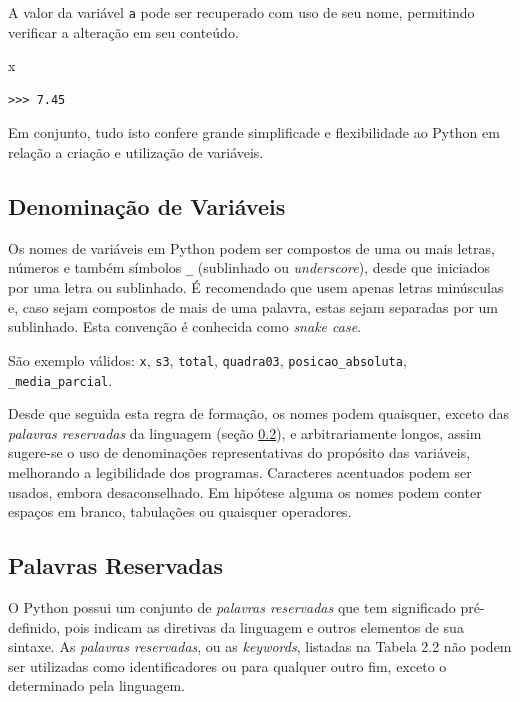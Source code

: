 \documentclass[
]{book}
\newenvironment{Shaded}{\begin{snugshade}}{\end{snugshade}}
\newcommand{\NormalTok}[1]{#1}
\begin{document}
A valor da variável \texttt{a} pode ser recuperado com uso de seu nome, permitindo verificar a alteração em seu conteúdo.

\begin{Shaded}
\begin{Highlighting}[]
\NormalTok{x}
\end{Highlighting}
\end{Shaded}

\begin{verbatim}
>>> 7.45
\end{verbatim}

Em conjunto, tudo isto confere grande simplificade e flexibilidade ao Python em relação a criação e utilização de variáveis.

\hypertarget{comput-varia-nomes}{%
\subsection{Denominação de Variáveis}\label{comput-varia-nomes}}

Os nomes de variáveis em Python podem ser compostos de uma ou mais letras, números e também símbolos \texttt{\_} (sublinhado ou \emph{underscore}), desde que iniciados por uma letra ou sublinhado. É recomendado que usem apenas letras minúsculas e, caso sejam compostos de mais de uma palavra, estas sejam separadas por um sublinhado. Esta convenção é conhecida como \emph{snake case}.

São exemplo válidos: \texttt{x}, \texttt{s3}, \texttt{total}, \texttt{quadra03}, \texttt{posicao\_absoluta}, \texttt{\_media\_parcial}.

Desde que seguida esta regra de formação, os nomes podem quaisquer, exceto das \emph{palavras reservadas} da linguagem (seção \ref{comput-varia-reser}), e arbitrariamente longos, assim sugere-se o uso de denominações representativas do propósito das variáveis, melhorando a legibilidade dos programas. Caracteres acentuados podem ser usados, embora desaconselhado. Em hipótese alguma os nomes podem conter espaços em branco, tabulações ou quaisquer operadores.

\hypertarget{comput-varia-reser}{%
\subsection{Palavras Reservadas}\label{comput-varia-reser}}

O Python possui um conjunto de \emph{palavras reservadas} que tem significado pré-definido, pois indicam as diretivas da linguagem e outros elementos de sua sintaxe. As \emph{palavras reservadas}, ou as \emph{keywords}, listadas na Tabela 2.2 não podem ser utilizadas como identificadores ou para qualquer outro fim, exceto o determinado pela linguagem.
\end{document}
